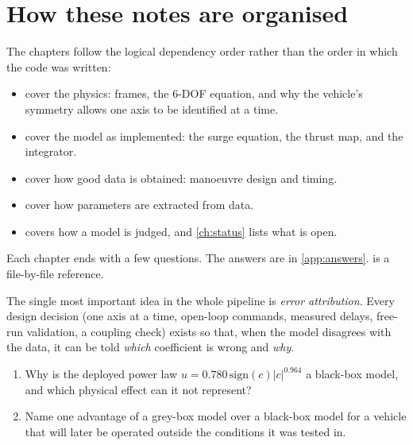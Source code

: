 \section{How these notes are organised}

The chapters follow the logical dependency order rather than the order in which the code
was written:
\begin{itemize}
  \item {} cover the physics: frames, the 6-DOF equation, and why the
        vehicle's symmetry allows one axis to be identified at a time.
  \item {} cover the model as implemented: the surge equation,
        the thrust map, and the integrator.
  \item {} cover how good data is obtained: manoeuvre design and timing.
  \item {} cover how parameters are extracted from data.
  \item {} covers how a model is judged, and \cref{ch:status} lists what is open.
\end{itemize}
Each chapter ends with a few questions. The answers are in \cref{app:answers}.
 is a file-by-file reference.

\begin{keyidea}
The single most important idea in the whole pipeline is \emph{error attribution}. Every design
decision (one axis at a time, open-loop commands, measured delays, free-run validation, a
coupling check) exists so that, when the model disagrees with the data, it can be told
\emph{which} coefficient is wrong and \emph{why}.
\end{keyidea}

\begin{questions}
\begin{enumerate}
  \item Why is the deployed power law $u = 0.780\,\mathrm{sign}(c)|c|^{0.964}$ a black-box
        model, and which physical effect can it not represent?
  \item Name one advantage of a grey-box model over a black-box model for a vehicle that
        will later be operated outside the conditions it was tested in.
\end{enumerate}
\end{questions}
